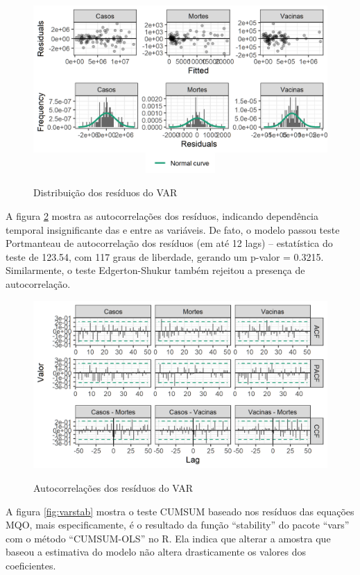\documentclass[
	12pt,				%
	oneside,			%
	a4paper,			%
	english,			%
	brazil				%
	hyperref = {colorlinks, citecolor=c1d, linkcolor=c2d, urlcolor=c3d, colorlinks}
	]{abntex2}
\newcounter{j}
\begin{document}
\begin{apendicesenv}
\begin{figure}[H]
    \centering
    \caption{Distribuição dos resíduos do VAR}
    \includegraphics[]{Figuras/varresdist.png} %
    \label{fig:varresdist}
\end{figure}

A figura \ref{fig:varresacf} mostra as autocorrelações dos resíduos, indicando dependência temporal insignificante das e entre as variáveis. De fato, o modelo passou teste Portmanteau de autocorrelação dos resíduos (em até 12 lags) -- estatística do teste de 123.54, com 117 graus de liberdade, gerando um p-valor = 0.3215. Similarmente, o teste Edgerton-Shukur também rejeitou a presença de autocorrelação.

\begin{figure}[H]
    \centering
    \caption{Autocorrelações dos resíduos do VAR}
    \includegraphics[]{Figuras/varresacf.png} %
    \label{fig:varresacf}
\end{figure}

A figura \ref{fig:varstab} mostra o teste CUMSUM baseado nos resíduos das equações MQO, mais especificamente, é o resultado da função ``stability'' do pacote ``vars'' com o método ``CUMSUM-OLS'' no R. Ela indica que alterar a amostra que baseou a estimativa do modelo não altera drasticamente os valores dos coeficientes.


\end{apendicesenv}
\end{document}
